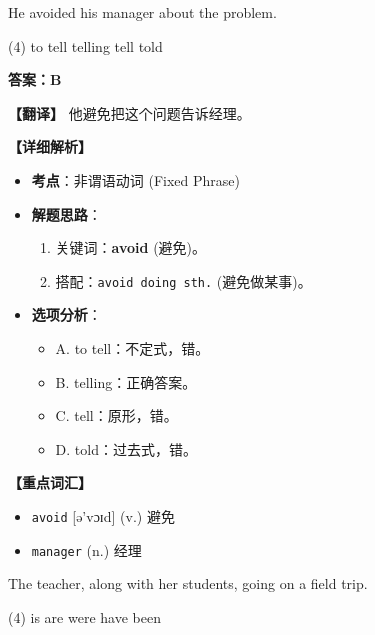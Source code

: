 \documentclass[11pt, a4paper]{article}
\newcommand{\analysis}[4]{
    \begin{solutionbox}
        \textbf{答案：#1}
        
        \textbf{【翻译】} #2
        
        \textbf{【详细解析】}
        #3
        
        \textbf{【重点词汇】}
        #4
    \end{solutionbox}
}
\newcommand{\blank}{\underline{\hspace{1.5cm}}}
\begin{document}
\begin{questions}
    \item He avoided \blank his manager about the problem.
    \begin{tasks}(4)
        \task to tell \task telling \task tell \task told
    \end{tasks}
    \analysis{B}{他避免把这个问题告诉经理。}{
        \begin{itemize}
            \item \textbf{考点}：非谓语动词 (Fixed Phrase)
            \item \textbf{解题思路}：
                \begin{enumerate}
                    \item 关键词：\textbf{avoid} (避免)。
                    \item 搭配：\texttt{avoid doing sth.} (避免做某事)。
                \end{enumerate}
            \item \textbf{选项分析}：
                \begin{itemize}
                    \item A. to tell：不定式，错。
                    \item B. telling：正确答案。
                    \item C. tell：原形，错。
                    \item D. told：过去式，错。
                \end{itemize}
        \end{itemize}
    }{
        \begin{itemize}
            \item \texttt{avoid} [ə'vɔɪd] (v.) 避免
            \item \texttt{manager} (n.) 经理
        \end{itemize}
    }

    \item The teacher, along with her students, \blank going on a field trip.
    \begin{tasks}(4)
        \task is \task are \task were \task have been
    \end{tasks}


\end{questions}
\end{document}
